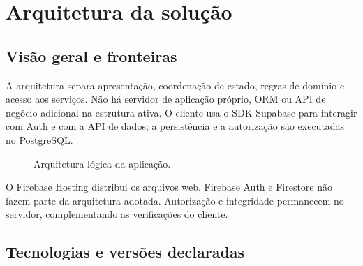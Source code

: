 \documentclass[
    12pt,
    oneside,
    a4paper,
    brazil
]{abntex2}
\begin{document}
\chapter{Arquitetura da solução}

\section{Visão geral e fronteiras}

A arquitetura separa apresentação, coordenação de estado, regras de domínio e acesso aos serviços. Não há servidor de aplicação próprio, ORM ou API de negócio adicional na estrutura ativa. O cliente usa o SDK Supabase para interagir com Auth e com a API de dados; a persistência e a autorização são executadas no PostgreSQL.

\begin{figure}[H]
\centering
{}
\caption{Arquitetura lógica da aplicação.}
\label{fig:arquitetura}
\end{figure}

O Firebase Hosting distribui os arquivos web. Firebase Auth e Firestore não fazem parte da arquitetura adotada. Autorização e integridade permanecem no servidor, complementando as verificações do cliente.

\section{Tecnologias e versões declaradas}
\end{document}
